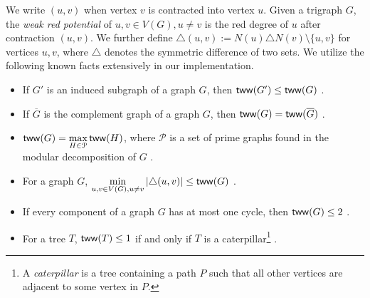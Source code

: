 \documentclass[a4paper,UKenglish,cleveref, autoref, thm-restate]{lipics-v2021}
\begin{document}
We write $(u,v)$ when vertex $v$ is contracted into vertex $u$.
Given a trigraph $G$, the \emph{weak red potential} of $u,v \in V(G), u \neq v$
is the red degree of $u$ after contraction $(u,v)$.
%
We further define
$\triangle(u,v) := N(u) \triangle N(v) \setminus \{u,v\}$ for vertices $u,v$,
where $\triangle$ denotes the symmetric difference of two sets.
%
%
%
%
%
%
We utilize the following known facts extensively in our implementation.
\begin{itemize}
    \item If $G'$ is an induced subgraph of a graph $G$, then $\textnormal{\textsf{tww}}(G') \leq \textnormal{\textsf{tww}}(G)$ \cite{bonnet_twin-width_2020}.
    \item If $\overline{G}$ is the complement graph of a graph $G$, then $\textnormal{\textsf{tww}}(G) = \textnormal{\textsf{tww}}(\overline{G})$ \cite{bonnet_twin-width_2020}.
    \item $\displaystyle \textnormal{\textsf{tww}}(G) = \max_{H \in \mathcal{P}} \textnormal{\textsf{tww}}(H)$,
    where $\mathcal{P}$ is a set of prime graphs found in the modular decomposition of $G$ \cite{schidler_sat_2021}.
    \item For a graph $G$, $\displaystyle \min_{u,v\in V(G), u \neq v}|\triangle(u,v)| \leq \textnormal{\textsf{tww}}(G)$ \cite{schidler_sat_2021}.
    \item If every component of a graph $G$ has at most one cycle, then $\textnormal{\textsf{tww}}(G) \leq 2$ \cite{ahn_bounds_2022}.
    \item For a tree $T$, $\textnormal{\textsf{tww}}(T) \leq 1$ if and only if $T$ is a caterpillar\footnote{%
    A \emph{caterpillar} is a tree containing a path $P$ such that all other vertices are
    adjacent to some vertex in $P$.
    } \cite{ahn_bounds_2022}.
\end{itemize}
\end{document}
